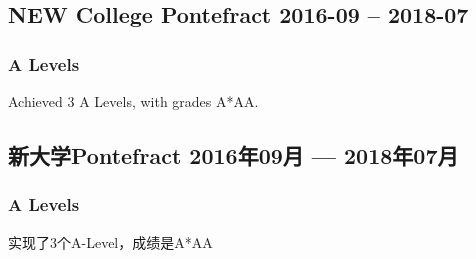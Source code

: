 \begin{xen}
    \subsection{NEW College Pontefract
        \hfill 2016-09 -- 2018-07}
        \subsubsection{A Levels}
            Achieved 3 A Levels, with grades A*AA.
\end{xen}
\begin{xcn}
        \subsection{新大学Pontefract
            \hfill 2016年09月 --- 2018年07月}
            \subsubsection{A Levels}
            实现了3个A-Level，成绩是A*AA
\end{xcn}
